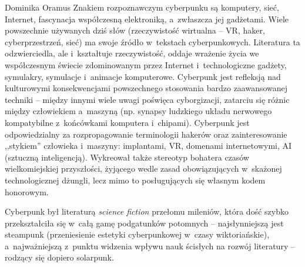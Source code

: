 \begin{artplenv}{Dominika Oramus}
Znakiem rozpoznawczym cyberpunku są komputery, sieć, Internet, fascynacja współczesną elektroniką, a~zwłaszcza jej gadżetami. Wiele powszechnie używanych dziś słów (rzeczywistość wirtualna -- VR, haker, cyberprzestrzeń, sieć) ma swoje źródło w~tekstach cyberpunkowych. Literatura ta odzwierciedla, ale i~kształtuje rzeczywistość, oddaje wrażenie życia we współczesnym świecie zdominowanym przez Internet i~technologiczne gadżety, symulakry, symulacje i~animacje komputerowe. Cyberpunk jest refleksją nad kulturowymi konsekwencjami powszechnego stosowania bardzo zaawansowanej techniki -- między innymi wiele uwagi poświęca cyborgizacji, zatarciu się różnic między człowiekiem a~maszyną (np. synapsy ludzkiego układu nerwowego kompatybilne z~końcówkami komputera i~chipami). Cyberpunk jest odpowiedzialny za rozpropagowanie terminologii hakerów oraz zainteresowanie ,,stykiem'' człowieka i~maszyny: implantami, VR, domenami internetowymi, AI (sztuczną inteligencją). Wykreował także stereotyp bohatera czasów wielkomiejskiej przyszłości, żyjącego wedle zasad obowiązujących w~skażonej technologicznej dżungli, lecz mimo to posługujących się własnym kodem honorowym.

Cyberpunk był literaturą \textit{science fiction} przełomu mileniów, która dość szybko przekształciła się w~całą gamę podgatunków potomnych -- najsłynniejszą jest steampunk (przeniesienie estetyki cyberpunkowej w~czasy wiktoriańskie), a~najważniejszą z~punktu widzenia wpływu nauk ścisłych na rozwój literatury -- rodzący się dopiero solarpunk.


\end{artplenv}
